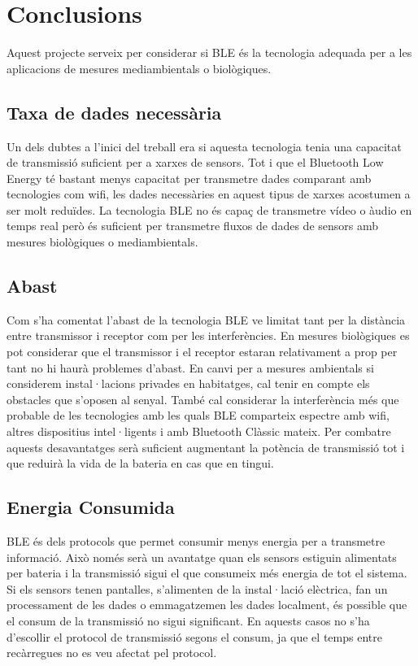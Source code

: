 \cleardoublepage
{}
\chapter*{Conclusions}

Aquest projecte serveix per considerar si BLE és la tecnologia adequada per a les aplicacions de mesures mediambientals o biològiques.

\section*{Taxa de dades necessària}

Un dels dubtes a l'inici del treball era si aquesta tecnologia tenia una capacitat de transmissió suficient per a xarxes de sensors.
Tot i que el Bluetooth Low Energy té bastant menys capacitat per transmetre dades comparant amb tecnologies com wifi, les dades necessàries en aquest tipus de xarxes acostumen a ser molt reduïdes.
La tecnologia BLE no és capaç de transmetre vídeo o àudio en temps real però és suficient per transmetre fluxos de dades de sensors amb mesures biològiques o mediambientals.

\section*{Abast}

Com s'ha comentat l'abast de la tecnologia BLE ve limitat tant per la distància entre transmissor i receptor com per les interferències.
En mesures biològiques es pot considerar que el transmissor i el receptor estaran relativament a prop per tant no hi haurà problemes d'abast.
En canvi per a mesures ambientals si considerem instal·lacions privades en habitatges, cal tenir en compte els obstacles que s'oposen al senyal.
També cal considerar la interferència més que probable de les tecnologies amb les quals BLE comparteix espectre amb wifi, altres dispositius intel·ligents i amb Bluetooth Clàssic mateix.
Per combatre aquests desavantatges serà suficient augmentant la potència de transmissió tot i que reduirà la vida de la bateria en cas que en tingui.

\section*{Energia Consumida}

BLE és dels protocols que permet consumir menys energia per a transmetre informació.
Això només serà un avantatge quan els sensors estiguin alimentats per bateria i la transmissió sigui el que consumeix més energia de tot el sistema.
Si els sensors tenen pantalles, s'alimenten de la instal·lació elèctrica, fan un processament de les dades o emmagatzemen les dades localment, és possible que el consum de la transmissió no sigui significant.
En aquests casos no s'ha d'escollir el protocol de transmissió segons el consum, ja que el temps entre recàrregues no es veu afectat pel protocol.


